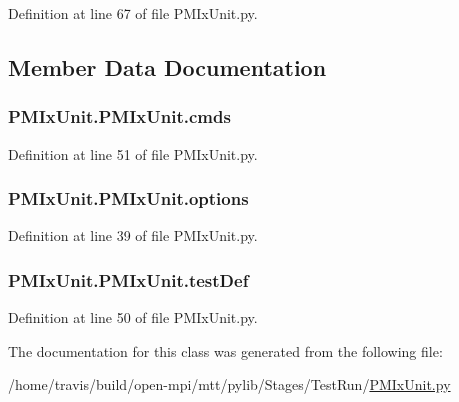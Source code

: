 Definition at line 67 of file P\-M\-Ix\-Unit.\-py.



\subsection{Member Data Documentation}
\hypertarget{class_p_m_ix_unit_1_1_p_m_ix_unit_a1130f07074aeff223235a147440868c4}{
\subsubsection[{cmds}]{\setlength{\rightskip}{0pt plus 5cm}P\-M\-Ix\-Unit.\-P\-M\-Ix\-Unit.\-cmds}}\label{class_p_m_ix_unit_1_1_p_m_ix_unit_a1130f07074aeff223235a147440868c4}


Definition at line 51 of file P\-M\-Ix\-Unit.\-py.

\hypertarget{class_p_m_ix_unit_1_1_p_m_ix_unit_a6c56979e7226a414874653b3e7a17dd8}{
\subsubsection[{options}]{\setlength{\rightskip}{0pt plus 5cm}P\-M\-Ix\-Unit.\-P\-M\-Ix\-Unit.\-options}}\label{class_p_m_ix_unit_1_1_p_m_ix_unit_a6c56979e7226a414874653b3e7a17dd8}


Definition at line 39 of file P\-M\-Ix\-Unit.\-py.

\hypertarget{class_p_m_ix_unit_1_1_p_m_ix_unit_a08b01eaf2867a0a02f8598018739e843}{
\subsubsection[{test\-Def}]{\setlength{\rightskip}{0pt plus 5cm}P\-M\-Ix\-Unit.\-P\-M\-Ix\-Unit.\-test\-Def}}\label{class_p_m_ix_unit_1_1_p_m_ix_unit_a08b01eaf2867a0a02f8598018739e843}


Definition at line 50 of file P\-M\-Ix\-Unit.\-py.



The documentation for this class was generated from the following file\-:\begin{DoxyCompactItemize}
\item 
/home/travis/build/open-\/mpi/mtt/pylib/\-Stages/\-Test\-Run/\hyperlink{_p_m_ix_unit_8py}{P\-M\-Ix\-Unit.\-py}\end{DoxyCompactItemize}
